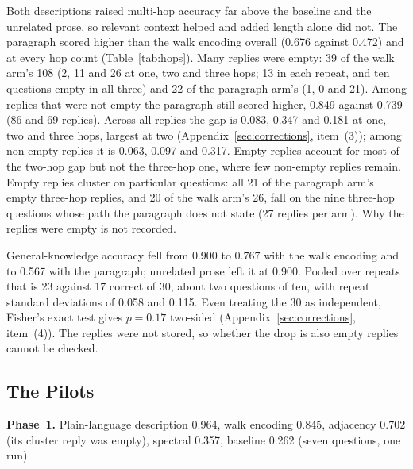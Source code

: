 \documentclass[11pt,a4paper]{article}
\begin{document}
Both descriptions raised multi-hop accuracy far above the baseline and the unrelated prose, so relevant context helped and added length alone did not. The paragraph scored higher than the walk encoding overall (0.676 against 0.472) and at every hop count (Table~\ref{tab:hops}). Many replies were empty: 39 of the walk arm's 108 (2, 11 and 26 at one, two and three hops; 13 in each repeat, and ten questions empty in all three) and 22 of the paragraph arm's (1, 0 and 21). Among replies that were not empty the paragraph still scored higher, 0.849 against 0.739 (86 and 69 replies). Across all replies the gap is 0.083, 0.347 and 0.181 at one, two and three hops, largest at two (Appendix~\ref{sec:corrections}, item~(3)); among non-empty replies it is 0.063, 0.097 and 0.317. Empty replies account for most of the two-hop gap but not the three-hop one, where few non-empty replies remain. Empty replies cluster on particular questions: all 21 of the paragraph arm's empty three-hop replies, and 20 of the walk arm's 26, fall on the nine three-hop questions whose path the paragraph does not state (27 replies per arm). Why the replies were empty is not recorded.

General-knowledge accuracy fell from 0.900 to 0.767 with the walk encoding and to 0.567 with the paragraph; unrelated prose left it at 0.900. Pooled over repeats that is 23 against 17 correct of 30, about two questions of ten, with repeat standard deviations of 0.058 and 0.115. Even treating the 30 as independent, Fisher's exact test gives $p = 0.17$ two-sided (Appendix~\ref{sec:corrections}, item~(4)). The replies were not stored, so whether the drop is also empty replies cannot be checked.

\subsection{The Pilots}

\textbf{Phase~1.} Plain-language description 0.964, walk encoding 0.845, adjacency 0.702 (its cluster reply was empty), spectral 0.357, baseline 0.262 (seven questions, one run).
\end{document}
